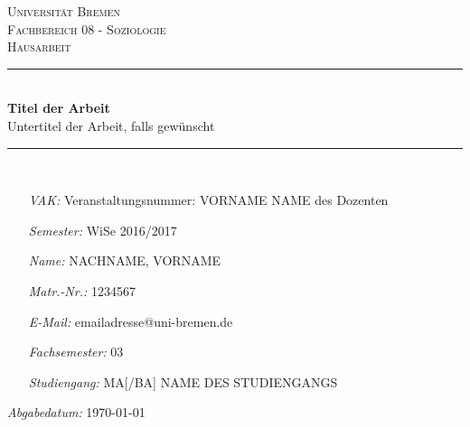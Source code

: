 \begin{titlepage}
\thispagestyle{empty}
\newcommand{\HRule}{\rule{\linewidth}{0.5mm}}
\hspace{1cm}
\center

\textsc{\huge Universität Bremen}\\[2.0cm]
\textsc{\Large Fachbereich 08 - Soziologie}\\[0.8cm]
\MSonehalfspacing
\textsc{\Large Hausarbeit}\\[1.0cm]

\HRule\\[1.4cm]
\MSdoublespacing
{ \huge \bfseries Titel der Arbeit}\\[0.2cm]
{ \large Untertitel der Arbeit, falls gewünscht}\\[0.3cm] %
\HRule \\[2.4cm]
\MSonehalfspacing

\begin{minipage}[t]{0.8\textwidth}
	\begin{itemize}
	\item[\emph{VAK:}] Veranstaltungsnummer: VORNAME NAME des Dozenten
	\item[\emph{Semester:}] WiSe 2016/2017
	\item[\emph{Name:}] NACHNAME, VORNAME
	\item[\emph{Matr.-Nr.:}] 1234567
	\item[\emph{E-Mail:}] emailadresse@uni-bremen.de
	\item[\emph{Fachsemester:}] 03
	\item[\emph{Studiengang:}] MA[/BA] NAME DES STUDIENGANGS
	\end{itemize}
\end{minipage}

\vspace{2.9cm}

\flushright \emph{Abgabedatum:} \today
\end{titlepage}
\restoregeometry

\tableofcontents
{}
\thispagestyle{empty}

\MSonehalfspacing
\newpage
\setcounter{page}{1}
\pagestyle{fancy}
